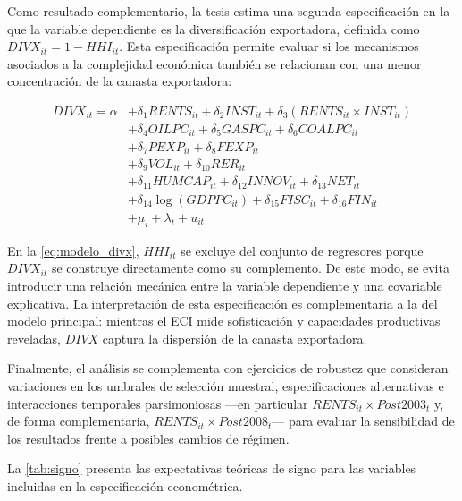 \documentclass[../../PTFM.tex]{subfiles}
\begin{document}
	Como resultado complementario, la tesis estima una segunda especificación en la que la variable dependiente es la diversificación exportadora, definida como $DIVX_{it}=1-HHI_{it}$. Esta especificación permite evaluar si los mecanismos asociados a la complejidad económica también se relacionan con una menor concentración de la canasta exportadora:

	\begin{equation}
		\label{eq:modelo_divx}
		\begin{aligned}
			DIVX_{it} = \alpha
			&+ \delta_1 RENTS_{it}
			+ \delta_2 INST_{it}
			+ \delta_3(RENTS_{it} \times INST_{it}) \\
			&+ \delta_4 OILPC_{it}
			+ \delta_5 GASPC_{it}
			+ \delta_6 COALPC_{it} \\
			&+ \delta_7 PEXP_{it}
			+ \delta_8 FEXP_{it} \\
			&+ \delta_9 VOL_{it}
			+ \delta_{10} RER_{it} \\
			&+ \delta_{11} HUMCAP_{it}
			+ \delta_{12} INNOV_{it}
			+ \delta_{13} NET_{it} \\
			&+ \delta_{14}\log(GDPPC_{it})
			+ \delta_{15} FISC_{it}
			+ \delta_{16} FIN_{it} \\
			&+ \mu_i + \lambda_t + u_{it}
		\end{aligned}
	\end{equation}

	En la \autoref{eq:modelo_divx}, $HHI_{it}$ se excluye del conjunto de regresores porque $DIVX_{it}$ se construye directamente como su complemento. De este modo, se evita introducir una relación mecánica entre la variable dependiente y una covariable explicativa. La interpretación de esta especificación es complementaria a la del modelo principal: mientras el ECI mide sofisticación y capacidades productivas reveladas, $DIVX$ captura la dispersión de la canasta exportadora.

	Finalmente, el análisis se complementa con ejercicios de robustez que consideran variaciones en los umbrales de selección muestral, especificaciones alternativas e interacciones temporales parsimoniosas ---en particular $RENTS_{it} \times Post2003_t$ y, de forma complementaria, $RENTS_{it} \times Post2008_t$--- para evaluar la sensibilidad de los resultados frente a posibles cambios de régimen.


	La \autoref{tab:signo} presenta las expectativas teóricas de signo para las variables incluidas en la especificación econométrica.
\end{document}
